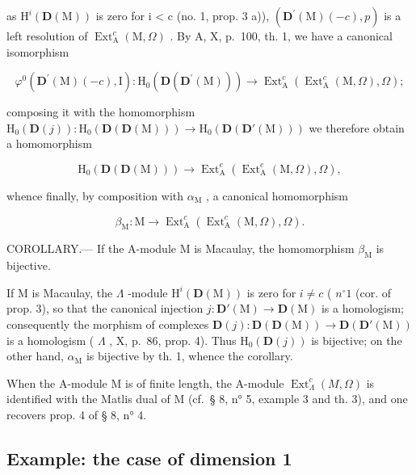 as \(\mathrm{H}^{i}(\mathbf{D}(\mathrm{M}))\) is zero for i \textless{} c (no. 1, prop. 3 a)), \((\mathbf{D}^{\prime}(\mathrm{M})(-c), p)\) is a left resolution of \(\operatorname{Ext}_{\mathrm{A}}^{c}(\mathrm{M}, \Omega)\) . By A, X, p.~100, th. 1, we have a canonical isomorphism

\[
\varphi^ {0} \left(\mathbf {D} ^ {\prime} (\mathrm{M}) (- c), \mathrm{I}\right): \mathrm{H} _ {0} \left(\mathbf {D} \left(\mathbf {D} ^ {\prime} (\mathrm{M})\right)\right) \longrightarrow \operatorname{Ext} _ {\mathrm{A}} ^ {c} \left(\operatorname{Ext} _ {\mathrm{A}} ^ {c} (\mathrm{M}, \Omega), \Omega\right);
\]

composing it with the homomorphism \(\mathrm{H}_{0}(\mathbf{D}(j)) : \mathrm{H}_{0}(\mathbf{D}(\mathbf{D}(\mathrm{M}))) \to \mathrm{H}_{0}(\mathbf{D}(\mathbf{D}'(\mathrm{M})))\) we therefore obtain a homomorphism

\[
\mathrm{H} _ {0} (\mathbf {D} (\mathbf {D} (\mathrm{M}))) \longrightarrow \operatorname{Ext} _ {\mathrm{A}} ^ {c} \left(\operatorname{Ext} _ {\mathrm{A}} ^ {c} (\mathrm{M}, \Omega), \Omega\right),
\]

whence finally, by composition with \(\alpha_{\mathrm{M}}\) , a canonical homomorphism

\[
\beta_ {\mathrm{M}}: \mathrm{M} \longrightarrow \operatorname{Ext} _ {\mathrm{A}} ^ {c} (\operatorname{Ext} _ {\mathrm{A}} ^ {c} (\mathrm{M}, \Omega), \Omega).
\]

COROLLARY.--- If the A-module M is Macaulay, the homomorphism \(\beta_{\mathrm{M}}\) is bijective.

If M is Macaulay, the \(\Lambda\) -module \(\mathrm{H}^i(\mathbf{D}(\mathrm{M}))\) is zero for \(i \neq c\) ( \(n^\circ 1\) (cor. of prop. 3), so that the canonical injection \(j: \mathbf{D}'(\mathrm{M}) \to \mathbf{D}(\mathrm{M})\) is a homologism; consequently the morphism of complexes \(\mathbf{D}(j): \mathbf{D}(\mathbf{D}(\mathrm{M})) \to \mathbf{D}(\mathbf{D}'(\mathrm{M}))\) is a homologism ( \(\Lambda\) , X, p.~86, prop. 4). Thus \(\mathrm{H}_0(\mathbf{D}(j))\) is bijective; on the other hand, \(\alpha_{\mathrm{M}}\) is bijective by th. 1, whence the corollary.

When the A-module M is of finite length, the A-module \(\operatorname{Ext}_{\Lambda}^{c}(M,\Omega)\) is identified with the Matlis dual of M (cf.~§ 8, n° 5, example 3 and th. 3), and one recovers prop. 4 of § 8, n° 4.

\subsection{Example: the case of dimension 1}

